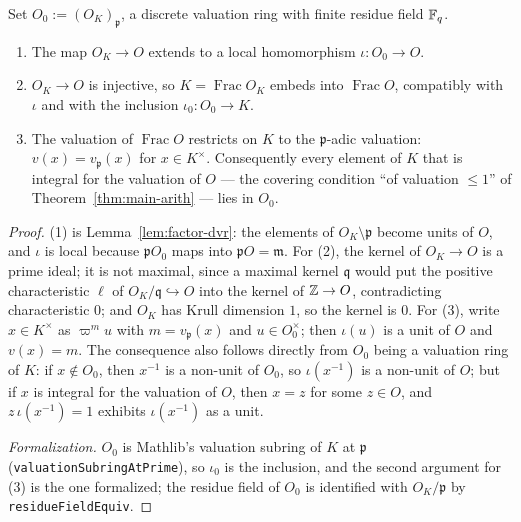 \begin{lemma}
\label{lem:factor-arithmetic}
\leanok
Set $O_0 := (O_K)_{\mathfrak p}$, a discrete valuation ring with finite residue field
$\mathbb{F}_q$.
\begin{enumerate}
\item The map $O_K \to O$ extends to a local homomorphism $\iota \colon O_0 \to O$.
\item $O_K \to O$ is injective, so $K = \operatorname{Frac} O_K$ embeds into
  $\operatorname{Frac} O$, compatibly with $\iota$ and with the inclusion
  $\iota_0 \colon O_0 \to K$.
\item The valuation of $\operatorname{Frac} O$ restricts on $K$ to the $\mathfrak p$-adic
  valuation: $v(x) = v_{\mathfrak p}(x)$ for $x \in K^\times$. Consequently every element
  of $K$ that is integral for the valuation of $O$ --- the covering condition ``of
  valuation $\le 1$'' of Theorem~\ref{thm:main-arith} --- lies in $O_0$.
\end{enumerate}
\end{lemma}
\begin{proof}
\leanok
(1) is Lemma~\ref{lem:factor-dvr}: the elements of $O_K \setminus \mathfrak p$ become
units of $O$, and $\iota$ is local because $\mathfrak p O_0$ maps into
$\mathfrak p O = \mathfrak m$. For (2), the kernel of $O_K \to O$ is a prime ideal; it is
not maximal, since a maximal kernel $\mathfrak q$ would put the positive characteristic
$\ell$ of $O_K/\mathfrak q \hookrightarrow O$ into the kernel of $\mathbb{Z} \to O$,
contradicting characteristic $0$; and $O_K$ has Krull dimension $1$, so the kernel is
$0$. For (3), write $x \in K^\times$ as $\varpi^m u$ with $m = v_{\mathfrak p}(x)$ and
$u \in O_0^\times$; then $\iota(u)$ is a unit of $O$ and $v(x) = m$. The consequence
also follows directly from $O_0$ being a valuation ring of $K$: if $x \notin O_0$, then
$x^{-1}$ is a non-unit of $O_0$, so $\iota(x^{-1})$ is a non-unit of $O$; but if $x$ is
integral for the valuation of $O$, then $x = z$ for some $z \in O$, and
$z\,\iota(x^{-1}) = 1$ exhibits $\iota(x^{-1})$ as a unit.

\emph{Formalization.} $O_0$ is Mathlib's valuation subring of $K$ at $\mathfrak p$
(\texttt{valuationSubringAtPrime}), so $\iota_0$ is the inclusion, and the second
argument for (3) is the one formalized; the residue field of $O_0$ is identified with
$O_K/\mathfrak p$ by \texttt{residueFieldEquiv}.
\end{proof}

